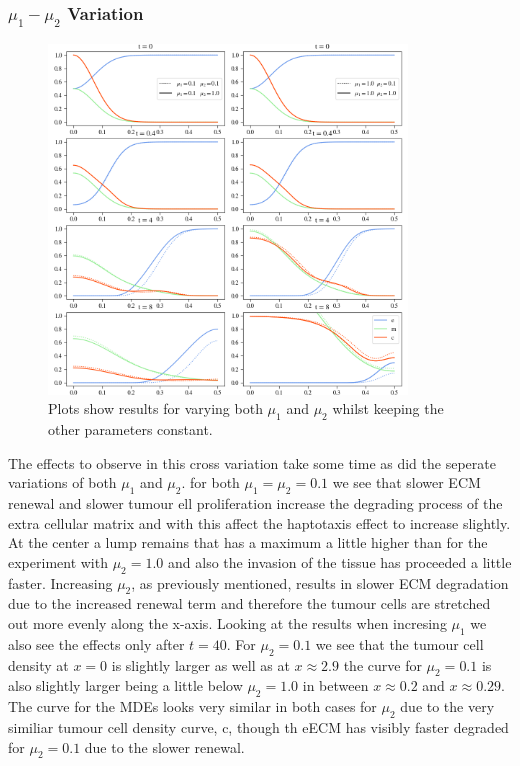 \subsubsection*{$\mu_1 - \mu_2$ Variation}
\begin{figure}[h]
    \centering
    \includegraphics[width=0.85\textwidth]{resources/images/prolif_mu_1_mu_2_variation.png}
    \caption{Plots show results for varying both $\mu_1$ and $\mu_2$ whilst keeping the other parameters constant.}
    \label{fig:prolif_mu_1_mu_2_variation}
\end{figure}
The effects to observe in this cross variation take some time as did the seperate variations of both $\mu_1$ and $\mu_2$. for both $\mu_1=\mu_2=0.1$ we see that slower ECM renewal and slower tumour ell proliferation increase the degrading process of the extra cellular matrix and with this affect the haptotaxis effect to increase slightly. At the center a lump remains that has a maximum a little higher than for the experiment with $\mu_2=1.0$ and also the invasion of the tissue has proceeded a little faster. Increasing $\mu_2$, as previously mentioned, results in slower ECM degradation due to the increased renewal term and therefore the tumour cells are stretched out more evenly along the x-axis. Looking at the results when incresing $\mu_1$ we also see the effects only after $t=40$. For $\mu_2=0.1$ we see that the tumour cell density at $x=0$ is slightly larger as well as at $x\approx 2.9$ the curve for $\mu_2=0.1$ is also slightly larger being a little below $\mu_2=1.0$ in between $x\approx 0.2$ and $x\approx 0.29$. The curve for the MDEs looks very similar in both cases for $\mu_2$ due to the very similiar tumour cell density curve, c, though th eECM has visibly faster degraded for $\mu_2=0.1$ due to the slower renewal.

